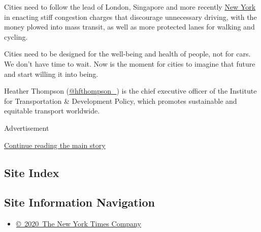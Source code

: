 Cities need to follow the lead of London, Singapore and more recently
\href{https://www.nytimes.com/2019/04/24/nyregion/what-is-congestion-pricing.html}{New
York} in enacting stiff congestion charges that discourage unnecessary
driving, with the money plowed into mass transit, as well as more
protected lanes for walking and cycling.

Cities need to be designed for the well-being and health of people, not
for cars. We don't have time to wait. Now is the moment for cities to
imagine that future and start willing it into being.

Heather Thompson (\href{https://twitter.com/hfthompson_}{@hfthompson\_})
is the chief executive officer of the Institute for Transportation \&
Development Policy, which promotes sustainable and equitable transport
worldwide.

Advertisement

\protect\hyperlink{after-bottom}{Continue reading the main story}

\hypertarget{site-index}{%
\subsection{Site Index}\label{site-index}}

\hypertarget{site-information-navigation}{%
\subsection{Site Information
Navigation}\label{site-information-navigation}}

\begin{itemize}
\tightlist
\item
  \href{https://help.nytimes.com/hc/en-us/articles/115014792127-Copyright-notice}{©~2020~The
  New York Times Company}
\end{itemize}

